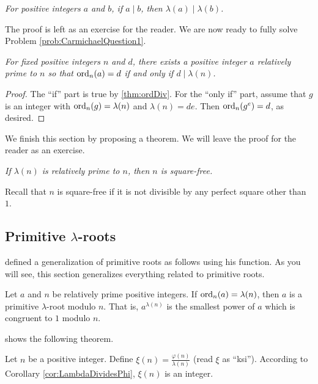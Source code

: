 \documentclass{subfile}
\begin{document}
	\begin{theorem}\slshape
		For positive integers $a$ and $b$, if $a \mid b$, then $\lambda(a) \mid \lambda(b)$.
	\end{theorem}
	The proof is left as an exercise for the reader. We are now ready to fully solve Problem \ref{prob:CarmichaelQuestion1}.
	\begin{theorem}\slshape
		For fixed positive integers $n$ and $d$, there exists a positive integer $a$  relatively prime to $n$ so that $\operatorname{ord}_n(a)=d$ if and only if $d \mid \lambda(n)$.
	\end{theorem}

	\begin{proof}
		The ``if'' part is true by \autoref{thm:ordDiv}. For the ``only if'' part, assume that $g$ is an integer with $\operatorname{ord}_n(g)=\lambda(n)$ and $\lambda(n)=de$. Then $\operatorname{ord}_n(g^e)=d$, as desired.
	\end{proof}

	We finish this section by proposing a theorem. We will leave the proof for the reader as an exercise.
		\begin{theorem}\slshape
			If $\lambda(n)$ is relatively prime to $n$, then $n$ is square-free.
		\end{theorem}
	Recall that $n$ is square-free if it is not divisible by any perfect square other than $1$.

	\subsection{Primitive \texorpdfstring{$\lambda$}{Lambda}-roots}
	\textcite[Page $232-233$, Result II]{carmichael_1910} defined a generalization of primitive roots as follows using his function. As you will see, this section generalizes everything related to primitive roots.
	\begin{definition}
		Let $a$ and $n$ be relatively prime positive integers. If $\operatorname{ord}_n(a)=\lambda(n)$, then $a$ is a primitive $\lambda$-root modulo $n$. That is, $a^{\lambda(n)}$ is the smallest power of $a$ which is congruent to $1$ modulo $n$.
	\end{definition}
\textcite{cameron_preece_2014} shows the following theorem.
	\begin{definition}
		Let $n$ be a positive integer. Define $\xi(n) = \frac{\varphi(n)}{\lambda(n)}$ (read $\xi$ as ``ksi''). According to Corollary \ref{cor:LambdaDividesPhi}, $\xi(n)$ is an integer.
	\end{definition}
\end{document}
